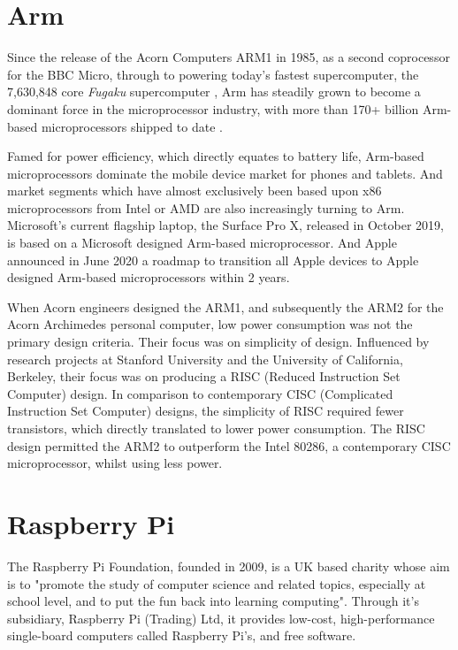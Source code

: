 %
%
\section{Arm}

Since the release of the Acorn Computers ARM1 in 1985, as a second coprocessor for the BBC Micro, through to powering today's fastest supercomputer, the 7,630,848 core \emph{Fugaku} supercomputer \cite{fujitsu-fugaku}, Arm has steadily grown to become a dominant force in the microprocessor industry, with more than 170+ billion Arm-based microprocessors shipped to date \cite{arm-fugaku}.

Famed for power efficiency, which directly equates to battery life, Arm-based microprocessors dominate the mobile device market for phones and tablets. And market segments which have almost exclusively been based upon x86 microprocessors from Intel or AMD are also increasingly turning to Arm. Microsoft's current flagship laptop, the Surface Pro X, released in October 2019, is based on a Microsoft designed Arm-based microprocessor. And Apple announced in June 2020 a roadmap to transition all Apple devices to Apple designed Arm-based microprocessors within 2 years.

When Acorn engineers designed the ARM1, and subsequently the ARM2 for the Acorn Archimedes personal computer, low power consumption was not the primary design criteria. Their focus was on simplicity of design. Influenced by research projects \cite{risc} at Stanford University and the University of California, Berkeley, their focus was on producing a RISC (Reduced Instruction Set Computer) design. In comparison to contemporary CISC (Complicated Instruction Set Computer) designs, the simplicity of RISC  required fewer transistors, which directly translated to lower power consumption. The RISC design permitted the ARM2 to outperform the Intel 80286, a contemporary CISC microprocessor, whilst using less power. 


%
%
\section{Raspberry Pi}

The Raspberry Pi Foundation, founded in 2009, is a UK based charity whose aim is to "promote the study of computer science and related topics, especially at school level, and to put the fun back into learning computing". Through it's subsidiary, Raspberry Pi (Trading) Ltd, it provides low-cost, high-performance single-board computers called Raspberry Pi's, and free software.


